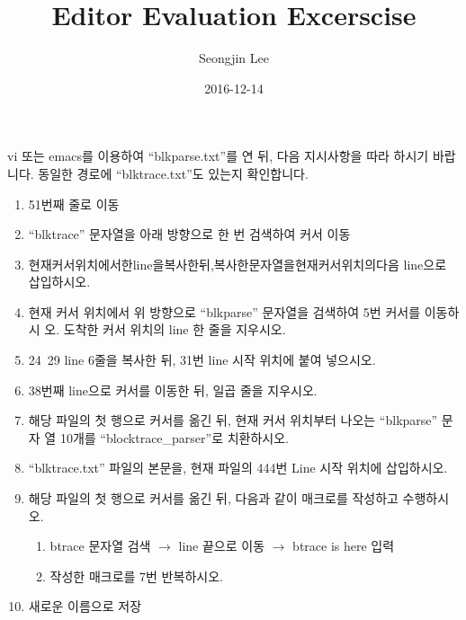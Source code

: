 \documentclass[12pt]{article}
\title{Editor Evaluation Excerscise}
\author{Seongjin Lee}
\date{2016-12-14}
\begin{document}
\maketitle

vi 또는 emacs를 이용하여 ``blkparse.txt''를 연 뒤, 다음 지시사항을 따라 하시기 바랍니다. 동일한 경로에 ``blktrace.txt''도 있는지 확인합니다.

\begin{enumerate}
\item 51번째 줄로 이동
\item ``blktrace'' 문자열을 아래 방향으로 한 번 검색하여 커서 이동
\item 현재커서위치에서한line을복사한뒤,복사한문자열을현재커서위치의다음 line으로 삽입하시오.
\item  현재 커서 위치에서 위 방향으로 ``blkparse'' 문자열을 검색하여 5번 커서를 이동하시 오. 도착한 커서 위치의 line 한 줄을 지우시오.
\item 24~29 line 6줄을 복사한 뒤, 31번 line 시작 위치에 붙여 넣으시오.
\item  38번째 line으로 커서를 이동한 뒤, 일곱 줄을 지우시오.
\item  해당 파일의 첫 행으로 커서를 옮긴 뒤, 현재 커서 위치부터 나오는 ``blkparse'' 문자 열 10개를 ``blocktrace\_parser''로 치환하시오.
\item  ``blktrace.txt'' 파일의 본문을, 현재 파일의 444번 Line 시작 위치에 삽입하시오.
\item  해당 파일의 첫 행으로 커서를 옮긴 뒤, 다음과 같이 매크로를 작성하고 수행하시오.
  \begin{enumerate}
  \item btrace 문자열 검색 $\rightarrow$ line 끝으로 이동 $\rightarrow$ btrace is here 입력
  \item 작성한 매크로를 7번 반복하시오.
  \end{enumerate}
\item 새로운 이름으로 저장
\end{enumerate}
\end{document}
